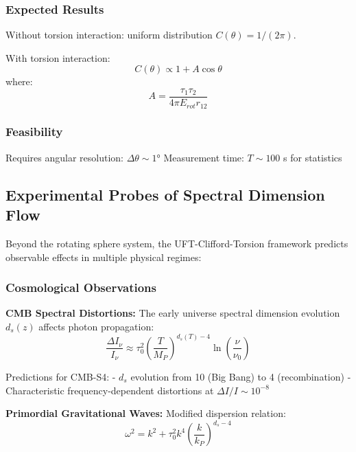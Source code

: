 \documentclass[12pt,a4paper]{article}
\begin{document}
\subsubsection{Expected Results}

Without torsion interaction: uniform distribution $C(\theta) = 1/(2\pi)$.

With torsion interaction:
\begin{equation}
    C(\theta) \propto 1 + A\cos\theta
\end{equation}
where:
\begin{equation}
    A = \frac{\tau_1\tau_2}{4\pi E_{rot}r_{12}}
\end{equation}

\subsubsection{Feasibility}

Requires angular resolution: $\Delta\theta \sim 1°$  
Measurement time: $T \sim 100$ s for statistics

\subsection{Experimental Probes of Spectral Dimension Flow}
\label{sec:experimental_probes}

Beyond the rotating sphere system, the UFT-Clifford-Torsion framework predicts observable effects in multiple physical regimes:

\subsubsection{Cosmological Observations}

\textbf{CMB Spectral Distortions:}
The early universe spectral dimension evolution $d_s(z)$ affects photon propagation:
\begin{equation}
    \frac{\Delta I_\nu}{I_\nu} \approx \tau_0^2 \left(\frac{T}{M_P}\right)^{d_s(T)-4} \ln\left(\frac{\nu}{\nu_0}\right)
\end{equation}

Predictions for CMB-S4:
- $d_s$ evolution from 10 (Big Bang) to 4 (recombination)
- Characteristic frequency-dependent distortions at $\Delta I/I \sim 10^{-8}$

\textbf{Primordial Gravitational Waves:}
Modified dispersion relation:
\begin{equation}
    \omega^2 = k^2 + \tau_0^2 k^4 \left(\frac{k}{k_P}\right)^{d_s-4}
\end{equation}
\end{document}
